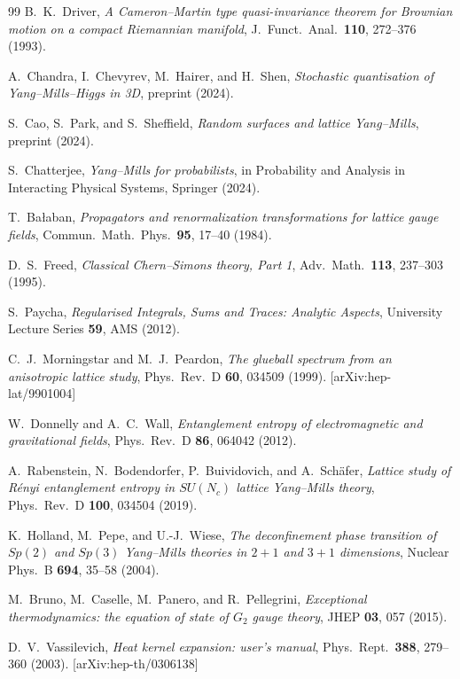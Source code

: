 \documentclass[11pt,a4paper]{amsart}
\theoremstyle{definition}
\theoremstyle{remark}
\begin{document}
\begin{thebibliography}{99}
B.~K.~Driver,
\emph{A Cameron--Martin type quasi-invariance theorem for Brownian motion on a compact Riemannian manifold},
J.\ Funct.\ Anal.\ \textbf{110}, 272--376 (1993).

A.~Chandra, I.~Chevyrev, M.~Hairer, and H.~Shen,
\emph{Stochastic quantisation of Yang--Mills--Higgs in 3D},
preprint (2024).

S.~Cao, S.~Park, and S.~Sheffield,
\emph{Random surfaces and lattice Yang--Mills},
preprint (2024).

S.~Chatterjee,
\emph{Yang--Mills for probabilists},
in Probability and Analysis in Interacting Physical Systems, Springer (2024).

T.~Ba\l aban,
\emph{Propagators and renormalization transformations for lattice gauge fields},
Commun.\ Math.\ Phys.\ \textbf{95}, 17--40 (1984).

D.~S.~Freed,
\emph{Classical Chern--Simons theory, Part 1},
Adv.\ Math.\ \textbf{113}, 237--303 (1995).

S.~Paycha,
\emph{Regularised Integrals, Sums and Traces: Analytic Aspects},
University Lecture Series \textbf{59}, AMS (2012).

C.~J.~Morningstar and M.~J.~Peardon,
\emph{The glueball spectrum from an anisotropic lattice study},
Phys.\ Rev.\ D \textbf{60}, 034509 (1999).
[arXiv:hep-lat/9901004]

W.~Donnelly and A.~C.~Wall,
\emph{Entanglement entropy of electromagnetic and gravitational fields},
Phys.\ Rev.\ D \textbf{86}, 064042 (2012).

A.~Rabenstein, N.~Bodendorfer, P.~Buividovich, and A.~Sch\"afer,
\emph{Lattice study of R\'enyi entanglement entropy in $SU(N_c)$ lattice Yang--Mills theory},
Phys.\ Rev.\ D \textbf{100}, 034504 (2019).

K.~Holland, M.~Pepe, and U.-J.~Wiese,
\emph{The deconfinement phase transition of $Sp(2)$ and $Sp(3)$ Yang--Mills theories in $2+1$ and $3+1$ dimensions},
Nuclear Phys.\ B \textbf{694}, 35--58 (2004).

M.~Bruno, M.~Caselle, M.~Panero, and R.~Pellegrini,
\emph{Exceptional thermodynamics: the equation of state of $G_2$ gauge theory},
JHEP \textbf{03}, 057 (2015).

D.~V.~Vassilevich,
\emph{Heat kernel expansion: user's manual},
Phys.\ Rept.\ \textbf{388}, 279--360 (2003).
[arXiv:hep-th/0306138]

\end{thebibliography}
\end{document}
